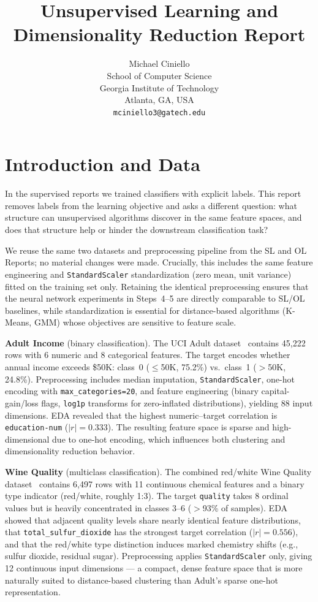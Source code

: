 \documentclass[conference]{IEEEtran}
\title{\LARGE \bf
Unsupervised Learning and Dimensionality Reduction Report
}
\author{
\parbox{3in}{
\centering
Michael Ciniello \\
School of Computer Science \\
Georgia Institute of Technology \\
Atlanta, GA, USA \\
{\tt\small mciniello3@gatech.edu}
}
}
\begin{document}
\maketitle
\thispagestyle{empty}
\pagestyle{empty}


\section{Introduction and Data}

In the supervised reports we trained classifiers with explicit labels. This
report removes labels from the learning objective and asks a different
question: what structure can unsupervised algorithms discover in the same
feature spaces, and does that structure help or hinder the downstream
classification task?

We reuse the same two datasets and preprocessing pipeline from the SL and
OL Reports; no material changes were made. Crucially, this includes the
same feature engineering and \texttt{StandardScaler} standardization
(zero mean, unit variance) fitted on the training set only. Retaining
the identical preprocessing ensures that the neural network experiments
in Steps~4--5 are directly comparable to SL/OL baselines, while
standardization is essential for distance-based algorithms (K-Means,
GMM) whose objectives are sensitive to feature scale.

\textbf{Adult Income} (binary classification). The UCI Adult
dataset~\cite{kohavi1996} contains 45{,}222 rows with 6 numeric and 8
categorical features. The target encodes whether annual income exceeds
\$50K: class~0 ($\leq$50K, 75.2\%) vs.\ class~1 ($>$50K, 24.8\%).
Preprocessing includes median imputation, \texttt{StandardScaler},
one-hot encoding with \texttt{max\_categories=20}, and feature engineering
(binary capital-gain/loss flags, \texttt{log1p} transforms for
zero-inflated distributions), yielding 88 input dimensions. EDA revealed
that the highest numeric--target correlation is \texttt{education-num}
($|r|=0.333$). The resulting feature space is sparse and high-dimensional
due to one-hot encoding, which influences both clustering and
dimensionality reduction behavior.

\textbf{Wine Quality} (multiclass classification). The combined red/white
Wine Quality dataset~\cite{cortez2009} contains 6{,}497 rows with 11
continuous chemical features and a binary type indicator (red/white, roughly
1:3). The target \texttt{quality} takes 8 ordinal values but is heavily
concentrated in classes 3--6 ($>$93\% of samples). EDA showed that adjacent
quality levels share nearly identical feature distributions, that
\texttt{total\_sulfur\_dioxide} has the strongest target correlation
($|r|=0.556$), and that the red/white type distinction induces marked
chemistry shifts (e.g., sulfur dioxide, residual sugar). Preprocessing
applies \texttt{StandardScaler} only, giving 12 continuous input
dimensions --- a compact, dense feature space that is more naturally
suited to distance-based clustering than Adult's sparse one-hot
representation.
\end{document}
